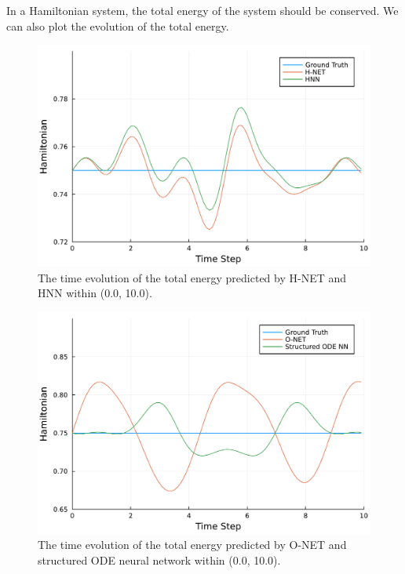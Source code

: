 \documentclass[
	parskip, 			   %
	twoside, 			   %
	DIV=14, 			   %
	BCOR=15.0mm, 		   %
	headsepline, 		   %
	open=right, 		   %
	captions=tableheading, %
	bibliography=totoc,    %
	numbers=noenddot       %
]{scrreprt}
\begin{document}
In a Hamiltonian system, the total energy of the system should be conserved. We can also plot the evolution of the total energy.

\begin{figure}[h!]
    \centering
    \includegraphics[scale=0.5]{figures/Hamiltonian_evolution_H_NET_and_HNN.pdf}
    \caption{The time evolution of the total energy predicted by H-NET and HNN within (0.0, 10.0).}
    \label{fig:Hamiltonian_evolution_H_NET_and_HNN}
\end{figure}

\clearpage
\begin{figure}[h!]
    \centering
    \includegraphics[scale=0.5]{figures/Hamiltonian_evolution_O_NET_and_structured_ODE_NN.pdf}
    \caption{The time evolution of the total energy predicted by O-NET and structured ODE neural network within (0.0, 10.0).}
    \label{fig:Hamiltonian_evolution_O_NET_and_structured_ODE_NN}
\end{figure}
\end{document}
